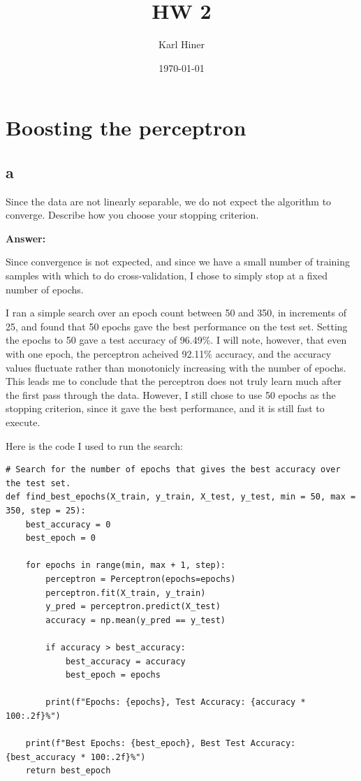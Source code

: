 \documentclass{article}
\title{HW 2}
\author{Karl Hiner}
\date{\today}
\begin{document}
\maketitle	

\section{Boosting the perceptron}

\subsection{a}
Since the data are not linearly separable, we do not expect the algorithm to converge.
Describe how you choose your stopping criterion.

\textbf{Answer:}

Since convergence is not expected, and since we have a small number of training samples with which to do cross-validation,
I chose to simply stop at a fixed number of epochs.

I ran a simple search over an epoch count between 50 and 350, in increments of 25, and found that 50 epochs gave the best performance on the test set.
Setting the epochs to 50 gave a test accuracy of 96.49\%.
I will note, however, that even with one epoch, the perceptron acheived 92.11\% accuracy, and the accuracy values fluctuate rather than monotonicly increasing with the number of epochs.
This leads me to conclude that the perceptron does not truly learn much after the first pass through the data.
However, I still chose to use 50 epochs as the stopping criterion, since it gave the best performance, and it is still fast to execute.

Here is the code I used to run the search:

\begin{small}
\begin{verbatim}
# Search for the number of epochs that gives the best accuracy over the test set.
def find_best_epochs(X_train, y_train, X_test, y_test, min = 50, max = 350, step = 25):
    best_accuracy = 0
    best_epoch = 0

    for epochs in range(min, max + 1, step):
        perceptron = Perceptron(epochs=epochs)
        perceptron.fit(X_train, y_train)
        y_pred = perceptron.predict(X_test)
        accuracy = np.mean(y_pred == y_test)

        if accuracy > best_accuracy:
            best_accuracy = accuracy
            best_epoch = epochs

        print(f"Epochs: {epochs}, Test Accuracy: {accuracy * 100:.2f}%")

    print(f"Best Epochs: {best_epoch}, Best Test Accuracy: {best_accuracy * 100:.2f}%")
    return best_epoch

\end{verbatim}
\end{small}
\end{document}
